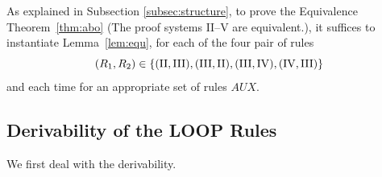 \documentclass[runningheads]{llncs}       %
\newcommand{\AUX}{\mathit{AUX}}
\begin{document}
As explained in Subsection \ref{subsec:structure}, to prove the
Equivalence Theorem~\ref{thm:abo} (The proof systems II--V are equivalent.),
it suffices to instantiate Lemma~\ref{lem:equ}, 
for each of the four pair of rules
\[
  (R_1, R_2) \in \mbox{$\{{(\mathrm{II}, \mathrm{III}),
    (\mathrm{III},\mathrm{II}),
    (\mathrm{III}, \mathrm{IV}),
    (\mathrm{IV}, \mathrm{III})}\}$}
\]
and each time for an appropriate set of rules $\AUX$.


\subsection{Derivability of the LOOP Rules}
\label{subsec:proof-derivability}

We first deal with the derivability.
\end{document}
